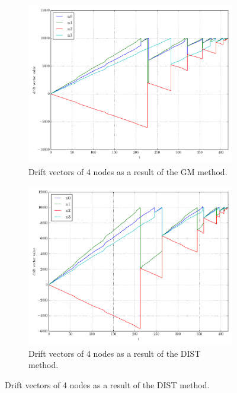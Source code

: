 \begin{figure}[H]
\begin{subfigure}{0.32\textwidth}
  \includegraphics[width=\linewidth]{img/matchings_classic_random_drifts.pdf}
  \caption{Drift vectors of 4 nodes as a result of the GM method.}
\end{subfigure}\hfill
\begin{subfigure}{0.32\textwidth}
  \includegraphics[width=\linewidth]{img/matchings_classic_distoptpair_drifts.pdf}
  \caption{Drift vectors of 4 nodes as a result of the DIST method.}
\end{subfigure}\hfill

\end{figure}
